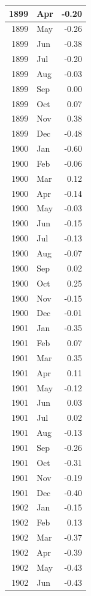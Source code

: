 \documentclass[
]{article}
\begin{document}
\begin{table}[H]
\begin{tabular}[t]{r|l|r}
\hline
1899 & Apr & -0.20\\
\hline
1899 & May & -0.26\\
\hline
1899 & Jun & -0.38\\
\hline
1899 & Jul & -0.20\\
\hline
1899 & Aug & -0.03\\
\hline
1899 & Sep & 0.00\\
\hline
1899 & Oct & 0.07\\
\hline
1899 & Nov & 0.38\\
\hline
1899 & Dec & -0.48\\
\hline
1900 & Jan & -0.60\\
\hline
1900 & Feb & -0.06\\
\hline
1900 & Mar & 0.12\\
\hline
1900 & Apr & -0.14\\
\hline
1900 & May & -0.03\\
\hline
1900 & Jun & -0.15\\
\hline
1900 & Jul & -0.13\\
\hline
1900 & Aug & -0.07\\
\hline
1900 & Sep & 0.02\\
\hline
1900 & Oct & 0.25\\
\hline
1900 & Nov & -0.15\\
\hline
1900 & Dec & -0.01\\
\hline
1901 & Jan & -0.35\\
\hline
1901 & Feb & 0.07\\
\hline
1901 & Mar & 0.35\\
\hline
1901 & Apr & 0.11\\
\hline
1901 & May & -0.12\\
\hline
1901 & Jun & 0.03\\
\hline
1901 & Jul & 0.02\\
\hline
1901 & Aug & -0.13\\
\hline
1901 & Sep & -0.26\\
\hline
1901 & Oct & -0.31\\
\hline
1901 & Nov & -0.19\\
\hline
1901 & Dec & -0.40\\
\hline
1902 & Jan & -0.15\\
\hline
1902 & Feb & 0.13\\
\hline
1902 & Mar & -0.37\\
\hline
1902 & Apr & -0.39\\
\hline
1902 & May & -0.43\\
\hline
1902 & Jun & -0.43\\

\end{tabular}
\end{table}
\end{document}
